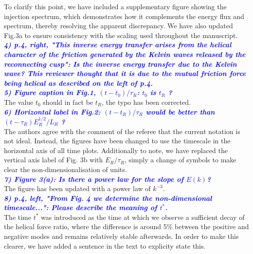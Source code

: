 \documentclass[a4paper,10pt]{article}
\def\blue#1{\textcolor{blue}{#1}}
\def\refcomment#1{\textbf{\blue{\emph{#1}}}\\}
\begin{document}
    To clarify this point, we have included a supplementary figure showing the injection spectrum, which demonstrates how it complements the energy flux and spectrum, thereby resolving the apparent discrepancy. We have also updated Fig.3a to ensure consistency with the scaling used throughout the manuscript. \\   


    \refcomment{4) p.4, right, "This inverse energy transfer arises from the helical
    character of the friction generated by the Kelvin waves released by
    the reconnecting cusp": Is the inverse energy transfer due to the
    Kelvin wave? This reviewer thought that it is due to the mutual
    friction force being helical as described on the left of p.4.}
  
    \refcomment{5) Figure caption in Fig.1, $(t - t_0)/\tau_R$: $t_0$ is $t_R$ ?}

    The value $t_0$ should in fact be $t_R$, the typo has been corrected.\\
    
    \refcomment{6) Horizontal label in Fig.2: $(t - t_R)/\tau_R$ would be better than $(t- \tau_R)E_R^{1/2}/L_R$ ?}

    The authors agree with the comment of the referee that the current notation is not ideal. Instead, the figures have been changed to use the timescale in the horizontal axis of all time plots. Additionally to note, we have replaced the vertical axis label of Fig. 3b with $E_R/\tau_R$, simply a change of symbols to make clear the non-dimensionalisation of units.\\
    
    \refcomment{7) Figure 3(a): Is there a power law for the slope of $E(k)$?}

    The figure has been updated with a power law of $k^{-3}$.\\
    
    \refcomment{8) p.4, left, "From Fig. 4 we determine the non-dimensional
    timescale...": Please describe the meaning of $t^*$.}

    The time $t^*$ was introduced as the time at which we observe a sufficient decay of the helical force ratio, where the difference is around 5\% between the positive and negative modes and remains relatively stable afterwards. In order to make this clearer, we have added a sentence in the text to explicity state this.
\end{document}
